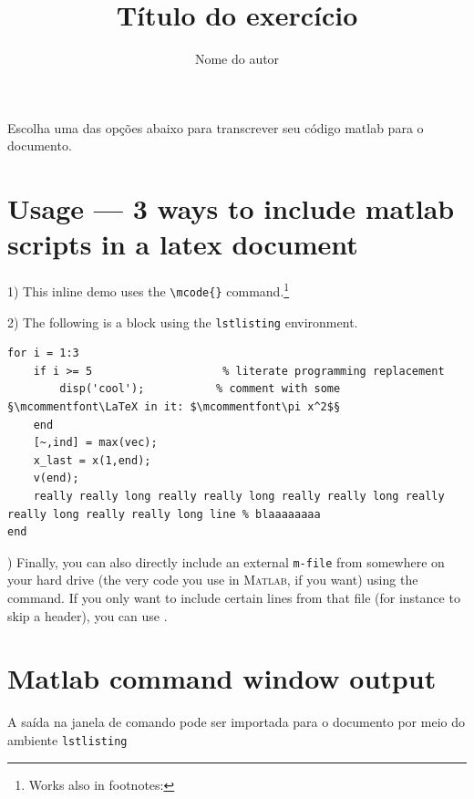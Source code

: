 \documentclass[a4paper,12pt]{article}
\title{Título do exercício}
\author{Nome do autor}
\begin{document}
\maketitle



Escolha uma das opções abaixo para transcrever seu código matlab para o documento.

\section*{Usage --- 3 ways to include matlab scripts in a latex document}

1) This inline demo  uses the \verb|\mcode{}| command.\footnote{Works also in footnotes: }

2) The following is a block using the \verb|lstlisting| environment.
\begin{lstlisting}
for i = 1:3
	if i >= 5                    % literate programming replacement
		disp('cool');           % comment with some §\mcommentfont\LaTeX in it: $\mcommentfont\pi x^2$§
	end
	[~,ind] = max(vec);
	x_last = x(1,end);
	v(end);
	really really long really really long really really long really really long really really long line % blaaaaaaaa
end
\end{lstlisting}

{) Finally, you can also directly include an external \texttt{m-file} from somewhere on your hard drive (the very code you use in \textsc{Matlab}, if you want) using the \verb|| command.  If you only want to include certain lines from that file (for instance to skip a header), you can use \verb||.

} %

\medskip

%

 



\section*{Matlab command window output}

A saída na janela de comando pode ser importada para o documento por meio do ambiente  \texttt{lstlisting}
\end{document}
